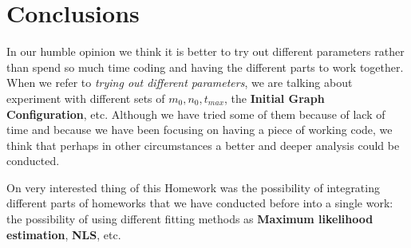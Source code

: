 \documentclass[12pt, a4paper]{article}
\begin{document}
\section{Conclusions}
In our humble opinion we think it is better to try out different parameters rather than spend so much time coding and having the different parts to work together. When we refer to \textit{trying out different parameters}, we are talking about
experiment with different sets of $m_0, n_0, t_{max}$, the \textbf{Initial Graph Configuration}, etc. Although we have tried some of them because of lack of time and because we have been focusing on having a piece of working code, we think that perhaps in 
other circumstances a better and deeper analysis could be conducted.

On very interested thing of this Homework was the possibility of integrating different parts of homeworks that we have conducted before into a single work: the possibility of using different fitting methods as \textbf{Maximum likelihood estimation}, \textbf{NLS}, etc.
\end{document}
